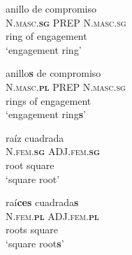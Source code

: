 \documentclass[output=paper]{langsci/langscibook}
\begin{document}
\begin{exe}
\begin{multicols}{2}
\ex 
	\begin{xlist}
    \ex \label{ex:anilloA}
	\glll anillo de compromiso\\
	\textsc{N.masc.\textbf{sg}} \textsc{PREP} \textsc{N.masc.sg} \\
    ring of engagement\\
	\glt `engagement ring' \\
    
    \columnbreak
    
	\ex \label{ex:anilloB}
	\glll anillo\textbf{s} de compromiso\\
	\textsc{N.masc.\textbf{pl}} \textsc{PREP} \textsc{N.masc.sg} \\
    rings of engagement\\
	\glt `engagement ring\textbf{s}'
	\end{xlist}
\end{multicols}
\begin{multicols}{2}
\ex
    \begin{xlist}
    \ex \label{ex:raizA}
	\glll raíz cuadrada\\
	\textsc{N.fem.\textbf{sg}} \textsc{ADJ.fem.\textbf{sg}} \\
    root square\\
	\glt `square root' \\

	\columnbreak

    \ex \label{ex:raizB}
	\glll raí\textbf{ces} cuadrada\textbf{s}\\
	\textsc{N.fem.\textbf{pl}} \textsc{ADJ.fem.\textbf{pl}} \\
    roots square\\
	\glt `square root\textbf{s}'
	\end{xlist}
\end{multicols}


\end{exe}
\end{document}
